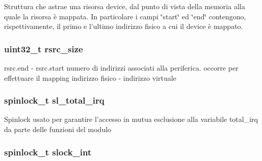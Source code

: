 Struttura che astrae una risorsa device, dal punto di vista della memoria alla quale la risorsa è mappata. In particolare i campi \char`\"{}start\char`\"{} ed \char`\"{}end\char`\"{} contengono, rispettivamente, il primo e l'ultimo indirizzo fisico a cui il device è mappato. \hypertarget{structmy_g_p_i_o_k__t_a0f87b53dc5049a349ef01aa586c0b5dc}{
\subsubsection[{rsrc\+\_\+size}]{\setlength{\rightskip}{0pt plus 5cm}uint32\+\_\+t rsrc\+\_\+size}}\label{structmy_g_p_i_o_k__t_a0f87b53dc5049a349ef01aa586c0b5dc}
rsrc.\+end -\/ rsrc.\+start numero di indirizzi associati alla periferica. occorre per effettuare il mapping indirizzo fisico -\/ indirizzo virtuale \hypertarget{structmy_g_p_i_o_k__t_ac41bbc7fe03ef25b7f468275fb565d78}{
\subsubsection[{sl\+\_\+total\+\_\+irq}]{\setlength{\rightskip}{0pt plus 5cm}spinlock\+\_\+t sl\+\_\+total\+\_\+irq}}\label{structmy_g_p_i_o_k__t_ac41bbc7fe03ef25b7f468275fb565d78}
Spinlock usato per garantire l'accesso in mutua esclusione alla variabile total\+\_\+irq da parte delle funzioni del modulo \hypertarget{structmy_g_p_i_o_k__t_a1e1ddf972b4dc84dd331a0c72e5d9895}{
\subsubsection[{slock\+\_\+int}]{\setlength{\rightskip}{0pt plus 5cm}spinlock\+\_\+t slock\+\_\+int}}\label{structmy_g_p_i_o_k__t_a1e1ddf972b4dc84dd331a0c72e5d9895}

